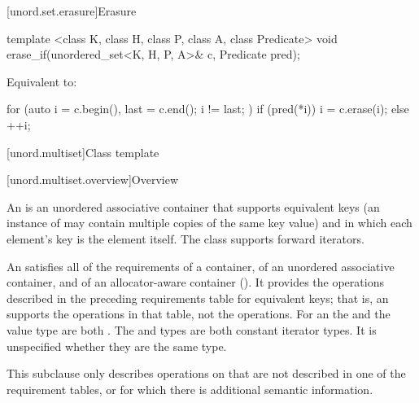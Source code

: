 [unord.set.erasure]{Erasure}

%
\begin{itemdecl}
template <class K, class H, class P, class A, class Predicate>
  void erase_if(unordered_set<K, H, P, A>& c, Predicate pred);
\end{itemdecl}

\begin{itemdescr}
\pnum
\effects
Equivalent to:
\begin{codeblock}
for (auto i = c.begin(), last = c.end(); i != last; ) {
  if (pred(*i)) {
    i = c.erase(i);
  } else {
    ++i;
  }
}
\end{codeblock}
\end{itemdescr}

[unord.multiset]{Class template }%

[unord.multiset.overview]{Overview}

\pnum
{}%
%
An  is an unordered associative container
that supports equivalent keys (an instance of  may contain
multiple copies of the same key value) and in which each element's key
is the element itself.
The  class
supports forward iterators.

\pnum
An  satisfies all of the requirements of a container, of an
unordered associative container, and of an allocator-aware container
(). It provides the operations described in the
preceding requirements table for equivalent keys; that is, an 
supports the  operations in that table, not the  operations.
For an  the  and the value type are
both . The  and  types are both
constant iterator types. It is unspecified whether they are the same type.

\pnum
This subclause only describes operations on  that
are not described in one of the requirement tables, or for which there
is additional semantic information.

